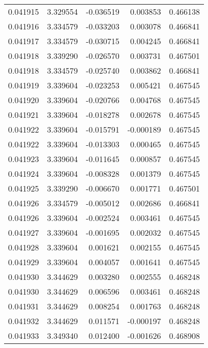 \begin{tabular}{lrrrr}
0.041915    &  3.329554 & -0.036519 &  0.003853 &             0.466138 \\
0.041916    &  3.334579 & -0.033203 &  0.003078 &             0.466841 \\
0.041917    &  3.334579 & -0.030715 &  0.004245 &             0.466841 \\
0.041918    &  3.339290 & -0.026570 &  0.003731 &             0.467501 \\
0.041918    &  3.334579 & -0.025740 &  0.003862 &             0.466841 \\
0.041919    &  3.339604 & -0.023253 &  0.005421 &             0.467545 \\
0.041920    &  3.339604 & -0.020766 &  0.004768 &             0.467545 \\
0.041921    &  3.339604 & -0.018278 &  0.002678 &             0.467545 \\
0.041922    &  3.339604 & -0.015791 & -0.000189 &             0.467545 \\
0.041922    &  3.339604 & -0.013303 &  0.000465 &             0.467545 \\
0.041923    &  3.339604 & -0.011645 &  0.000857 &             0.467545 \\
0.041924    &  3.339604 & -0.008328 &  0.001379 &             0.467545 \\
0.041925    &  3.339290 & -0.006670 &  0.001771 &             0.467501 \\
0.041926    &  3.334579 & -0.005012 &  0.002686 &             0.466841 \\
0.041926    &  3.339604 & -0.002524 &  0.003461 &             0.467545 \\
0.041927    &  3.339604 & -0.001695 &  0.002032 &             0.467545 \\
0.041928    &  3.339604 &  0.001621 &  0.002155 &             0.467545 \\
0.041929    &  3.339604 &  0.004057 &  0.001641 &             0.467545 \\
0.041930    &  3.344629 &  0.003280 &  0.002555 &             0.468248 \\
0.041930    &  3.344629 &  0.006596 &  0.003461 &             0.468248 \\
0.041931    &  3.344629 &  0.008254 &  0.001763 &             0.468248 \\
0.041932    &  3.344629 &  0.011571 & -0.000197 &             0.468248 \\
0.041933    &  3.349340 &  0.012400 & -0.001626 &             0.468908 \\

\end{tabular}
